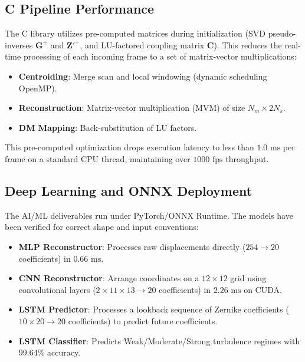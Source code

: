 \documentclass[10pt,journal,compsoc]{IEEEtran}
\begin{document}
\subsection{C Pipeline Performance}
The C library utilizes pre-computed matrices during initialization (SVD pseudo-inverses $\bm{G}^{+}$ and $\bm{Z}'^{+}$, and LU-factored coupling matrix $\bm{C}$). This reduces the real-time processing of each incoming frame to a set of matrix-vector multiplications:
\begin{itemize}
    \item \textbf{Centroiding}: Merge scan and local windowing (dynamic scheduling OpenMP).
    \item \textbf{Reconstruction}: Matrix-vector multiplication (MVM) of size $N_m \times 2N_s$.
    \item \textbf{DM Mapping}: Back-substitution of LU factors.
\end{itemize}
This pre-computed optimization drops execution latency to less than $1.0\text{ ms}$ per frame on a standard CPU thread, maintaining over $1000\text{ fps}$ throughput.

\subsection{Deep Learning and ONNX Deployment}
The AI/ML deliverables run under PyTorch/ONNX Runtime. The models have been verified for correct shape and input conventions:
\begin{itemize}
    \item \textbf{MLP Reconstructor}: Processes raw displacements directly ($254 \to 20$ coefficients) in $0.66\text{ ms}$.
    \item \textbf{CNN Reconstructor}: Arrange coordinates on a $12\times12$ grid using convolutional layers ($2 \times 11 \times 13 \to 20$ coefficients) in $2.26\text{ ms}$ on CUDA.
    \item \textbf{LSTM Predictor}: Processes a lookback sequence of Zernike coefficients ($10 \times 20 \to 20$ coefficients) to predict future coefficients.
    \item \textbf{LSTM Classifier}: Predicts Weak/Moderate/Strong turbulence regimes with 99.64\% accuracy.
\end{itemize}
\end{document}
